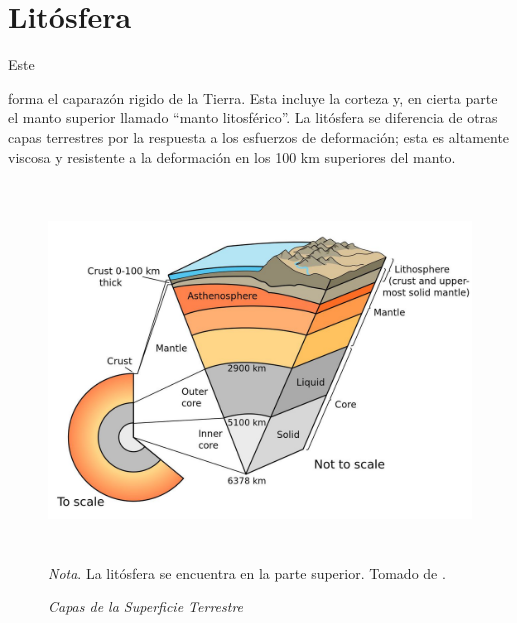 \documentclass[stu, 12pt, letterpaper, donotrepeattitle, floatsintext, natbib]{apa7}
\begin{document}
\section{Litósfera}
Este \begin{justifying}
    forma el caparazón rigido de la Tierra. Esta incluye la corteza y, en cierta parte el manto superior llamado ``manto litosférico''. %
    La litósfera se diferencia de otras capas terrestres por la respuesta a los esfuerzos de deformación; esta
    es altamente viscosa y resistente a la deformación en los 100 km superiores del manto. \citep{penalba-2008}\par 
\end{justifying}
\begin{figure}[H]
    \caption{\emph{Capas de la Superficie Terrestre}}
    \centering
    \includegraphics[width=14cm,height=10cm]{litosphere.jpg}
    \bigskip
    \\\small\textit{Nota}. La litósfera se encuentra en la parte superior. Tomado de \cite{unknown-author-no-dateA}. %
\end{figure}
\vspace{\baselineskip}
\end{document}
